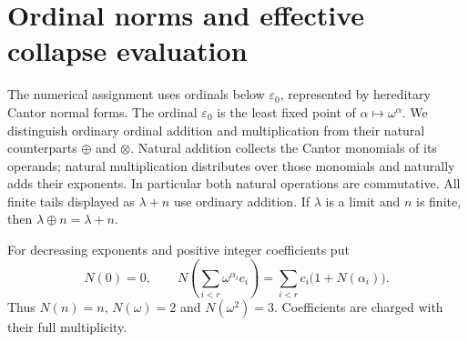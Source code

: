 \section{Ordinal norms and effective collapse evaluation}
\label{sec:foundations}

The numerical assignment uses ordinals below $\varepsilon_0$, represented
by hereditary Cantor normal forms.  The ordinal $\varepsilon_0$ is the
least fixed point of $\alpha\mapsto\omega^\alpha$.  We distinguish
ordinary ordinal addition and multiplication from their natural
counterparts $\oplus$ and $\otimes$.  Natural addition collects the
Cantor monomials of its operands; natural multiplication distributes over
those monomials and naturally adds their exponents.  In particular both
natural operations are commutative.  All finite tails displayed as
$\lambda+n$ use ordinary addition.  If $\lambda$ is a limit and $n$ is
finite, then $\lambda\oplus n=\lambda+n$.

\begin{definition}\label{def:additive-norm}
For decreasing exponents and positive integer coefficients put
\[
 N(0)=0,\qquad
 N\left(\sum_{i<r}\omega^{\alpha_i}c_i\right)
       =\sum_{i<r}c_i\bigl(1+N(\alpha_i)\bigr).
\]
Thus $N(n)=n$, $N(\omega)=2$ and $N(\omega^2)=3$.
Coefficients are charged with their full multiplicity.
\end{definition}

